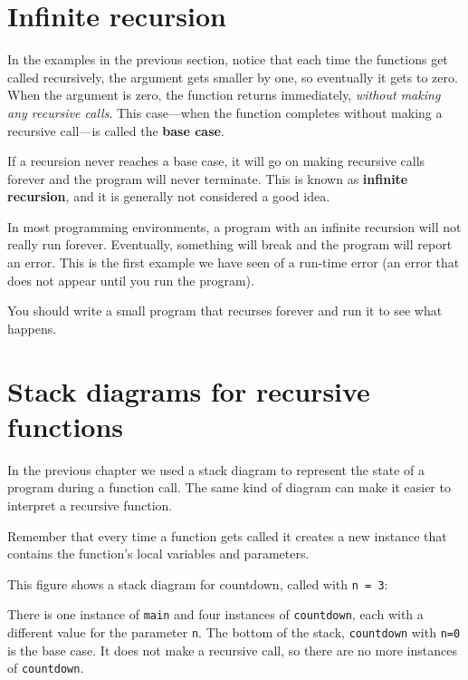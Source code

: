 \section {Infinite recursion}

In the examples in the previous section, notice that each time the
functions get called recursively, the argument gets smaller by one, so
eventually it gets to zero.  When the argument is zero, the function
returns immediately, {\em without making any recursive calls}.
This case---when the function completes without making a recursive
call---is called the {\bf base case}.

If a recursion never reaches a base case, it will go on making recursive
calls forever and the program will never terminate.  This is known as
{\bf infinite recursion}, and it is generally not considered a good
idea.


In most programming environments, a program with an infinite
recursion will not really run forever.  Eventually, something
will break and the program will report an error.  This is the
first example we have seen of a run-time error (an error that
does not appear until you run the program).

You should write a small program that recurses forever and run
it to see what happens.

\section {Stack diagrams for recursive functions}

In the previous chapter we used a stack diagram to represent the
state of a program during a function call.  The same kind
of diagram can make it easier to interpret a recursive function.

Remember that every time a function gets called it creates
a new instance that contains
the function's local variables and parameters.

This figure shows a stack diagram for countdown, called
with {\tt n = 3}:

\vspace{0.1in}
\centerline{}
\vspace{0.1in}
%
There is one instance of {\tt main} and four instances of
{\tt countdown}, each with a different value for the parameter
{\tt n}.  The bottom of the stack, {\tt countdown} with {\tt n=0}
is the base case.  It does not make a recursive call, so there
are no more instances of {\tt countdown}.

